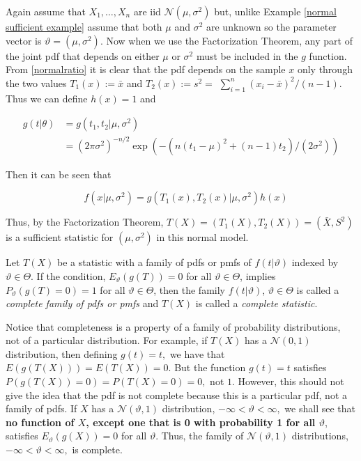 \documentclass[ 11pt,%
				a4paper,%
				twoside,%
				headinclude,%
				footinclude = true,%
				cleardoublepage = empty,%
				reqno]{scrbook}
\begin{document}
\begin{example}

Again assume that $X_{1}, \ldots, X_{n}$ are iid $\mathcal{N}\left(\mu, \sigma^{2}\right)$ but, unlike Example \ref{normal sufficient example} assume that both $\mu$ and $\sigma^{2}$ are unknown so the parameter vector is $\vartheta = \left(\mu, \sigma^{2}\right)$. Now when we use the Factorization Theorem, any part of the joint pdf that depends on either $\mu$ or $\sigma^{2}$ must be included in the $g$ function. From \eqref{normalratio} it is clear that the pdf depends on the sample $x$ only through the two values $T_{1}(x):=\bar{x}$ and $T_{2}(x):=s^{2}=$ $\sum_{i=1}^{n}\left(x_{i}-\bar{x}\right)^{2} /(n-1) .$ Thus we can define $h({x})=1$ and

\[
\begin{aligned}
g({t} | \theta) &=g\left(t_{1}, t_{2} | \mu, \sigma^{2}\right) \\
&=\left(2 \pi \sigma^{2}\right)^{-n / 2} \exp \left(-\left(n\left(t_{1}-\mu\right)^{2}+(n-1) t_{2}\right) /\left(2 \sigma^{2}\right)\right)
\end{aligned}
\]

Then it can be seen that

\[
\quad f\left({x} | \mu, \sigma^{2}\right)=g\left(T_{1}({x}), T_{2}({x}) | \mu, \sigma^{2}\right) h({x})
\]

Thus, by the Factorization Theorem, $T({X})=\left(T_{1}({X}), T_{2}({X})\right)=\left(\bar{X}, S^{2}\right)$ is a sufficient statistic for $\left(\mu, \sigma^{2}\right)$ in this normal model.

\end{example}


\begin{definition}
Let $T({X})$ be a statistic with a family of pdfs or pmfs of $f(t | \vartheta)$ indexed by  $\vartheta\in\Theta$. If the condition, ${E}_{\vartheta} (g(T))=0$ for all $\vartheta\in\Theta$, implies $P_{\vartheta}(g(T)=0)=1$ for all $\vartheta\in\Theta$, then the family $f(t | \vartheta)$,  $\vartheta\in\Theta$ is called a \emph{complete family of pdfs or pmfs} and $T({X})$ is called a \emph{complete statistic}.
\end{definition}

Notice that completeness is a property of a family of probability distributions, 
not of a particular distribution. For example, if $T(X)$ has a $\mathcal{N}(0,1)$
 distribution, then defining $g(t)=t,$ we have that $E(g(T(X)))=E(T(X))=0$. But the function $g(t)=t$ satisfies $P(g(T(X))=0)=P(T(X)=0)=0,$ not $1$. However, this should not give the idea that the pdf is not complete because this is a particular pdf, not a family of pdfs. If $X$ has a  $\mathcal{N}(\vartheta, 1)$ distribution, $-\infty<\vartheta<\infty,$ we shall see that \textbf{no function of $X$, except one that is 0 with probability 1 for all $\vartheta$}, satisfies ${E}_{\vartheta} (g(X))=0$ for all $\vartheta$. Thus, the family of $\mathcal{N}(\vartheta, 1)$ distributions, $-\infty<\vartheta<\infty,$ is complete.
\end{document}
